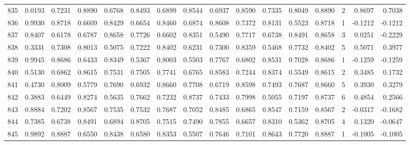\begin{tabular}{lrrrrrrrrrrrrrrr}
835 &      0.0193 &  0.7231 &  0.8890 &  0.6768 &  0.8493 &  0.6899 &  0.8544 &  0.6937 &  0.8590 &  0.7335 &   0.8049 &     0.8890 &      2 &                    0.8697 &                     0.7038 \\
836 &      0.9930 &  0.8718 &  0.6609 &  0.8429 &  0.6654 &  0.8460 &  0.6874 &  0.8608 &  0.7372 &  0.8131 &   0.5523 &     0.8718 &      1 &                   -0.1212 &                    -0.1212 \\
837 &      0.8407 &  0.6178 &  0.6787 &  0.8658 &  0.7726 &  0.6602 &  0.8351 &  0.5490 &  0.7717 &  0.6738 &   0.8491 &     0.8658 &      3 &                    0.0251 &                    -0.2229 \\
838 &      0.3331 &  0.7308 &  0.8013 &  0.5075 &  0.7222 &  0.8402 &  0.6231 &  0.7300 &  0.8359 &  0.5468 &   0.7732 &     0.8402 &      5 &                    0.5071 &                     0.3977 \\
839 &      0.9945 &  0.8686 &  0.6433 &  0.8349 &  0.5367 &  0.8003 &  0.5503 &  0.7767 &  0.6802 &  0.8531 &   0.7028 &     0.8686 &      1 &                   -0.1259 &                    -0.1259 \\
840 &      0.5130 &  0.6862 &  0.8615 &  0.7531 &  0.7505 &  0.7741 &  0.6765 &  0.8583 &  0.7244 &  0.8374 &   0.5549 &     0.8615 &      2 &                    0.3485 &                     0.1732 \\
841 &      0.4730 &  0.8009 &  0.5779 &  0.7690 &  0.6932 &  0.8660 &  0.7708 &  0.6719 &  0.8598 &  0.7493 &   0.7687 &     0.8660 &      5 &                    0.3930 &                     0.3279 \\
842 &      0.3883 &  0.6449 &  0.8274 &  0.5635 &  0.7662 &  0.7232 &  0.8737 &  0.7433 &  0.7998 &  0.5055 &   0.7197 &     0.8737 &      6 &                    0.4854 &                     0.2566 \\
843 &      0.8884 &  0.7202 &  0.8567 &  0.7535 &  0.7532 &  0.7687 &  0.7052 &  0.8485 &  0.6865 &  0.8547 &   0.7159 &     0.8567 &      2 &                   -0.0317 &                    -0.1682 \\
844 &      0.7385 &  0.6738 &  0.8491 &  0.6894 &  0.8705 &  0.7515 &  0.7490 &  0.7855 &  0.6657 &  0.8310 &   0.5362 &     0.8705 &      4 &                    0.1320 &                    -0.0647 \\
845 &      0.9892 &  0.8887 &  0.6550 &  0.8438 &  0.6580 &  0.8353 &  0.5507 &  0.7646 &  0.7101 &  0.8643 &   0.7720 &     0.8887 &      1 &                   -0.1005 &                    -0.1005 \\

\end{tabular}
